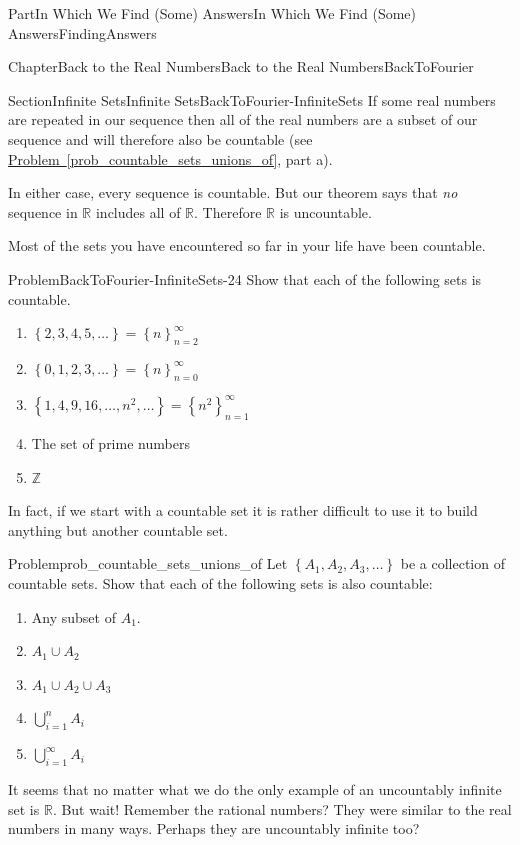 \documentclass[oneside,10pt,]{book}
\newcommand{\xreffont}{\relax}
\numberwithin{equation}{part}
\newcommand{\RR}{\mathbb {R}}
\newcommand{\ZZ}{\mathbb {Z}}
\begin{document}
\begin{partptx}{Part}{In Which We Find (Some) Answers}{}{In Which We Find (Some) Answers}{}{}{FindingAnswers}
\begin{chapterptx}{Chapter}{Back to the Real Numbers}{}{Back to the Real Numbers}{}{}{BackToFourier}
\begin{sectionptx}{Section}{Infinite Sets}{}{Infinite Sets}{}{}{BackToFourier-InfiniteSets}
If some real numbers are repeated in our sequence then all of the real numbers are a subset of our sequence and will therefore also be countable (see \hyperref[prob_countable_sets_unions_of]{Problem~{\xreffont\ref{prob_countable_sets_unions_of}}}, part a).%
\par
In either case, every sequence is countable.  But our theorem says that \emph{no} sequence in \(\RR\) includes all of \(\RR\).  Therefore \(\RR\) is uncountable.%
\par
Most of the sets you have encountered so far in your life have been countable.%
\begin{problem}{Problem}{}{BackToFourier-InfiniteSets-24}%
Show that each of the following sets is countable.%
\begin{enumerate}[font=\bfseries,label=(\alph*),ref=\alph*]%
\item{}\(\left\{2,3,4,5,\ldots\right\}=\left\{n\right\}_{n=2}^\infty\)%
\item{}\(\left\{0,1,2,3,\ldots\right\}=\left\{n\right\}_{n=0}^\infty\)%
\item{}\(\left\{1,4,9,16,\ldots,n^2,\ldots\right\}=\left\{n^2\right\}_{n=1}^\infty\)%
\item{}The set of prime numbers%
\item{}\(\ZZ\)%
\end{enumerate}%
\end{problem}
In fact, if we start with a countable set it is rather difficult to use it to build anything but another countable set.%
\begin{problem}{Problem}{}{prob_countable_sets_unions_of}%
Let \(\left\{A_1, A_2, A_3, \ldots \right\}\) be a collection of countable sets.  Show that each of the following sets is also countable:%
\begin{enumerate}[font=\bfseries,label=(\alph*),ref=\alph*]%
\item{}Any subset of \(A_1\).%
\item{}\(A_1\cup A_2\)%
\item{}\(A_1\cup A_2 \cup A_3\)%
\item{}\(\displaystyle\bigcup_{i=1}^nA_i\)%
\item{}\(\displaystyle\bigcup_{i=1}^\infty A_i\)%
\end{enumerate}%
\end{problem}
It seems that no matter what we do the only example of an uncountably infinite set is \(\RR\).  But wait!  Remember the rational numbers?  They were similar to the real numbers in many ways.  Perhaps they are uncountably infinite too?%

\end{sectionptx}
\end{chapterptx}
\end{partptx}
\end{document}
